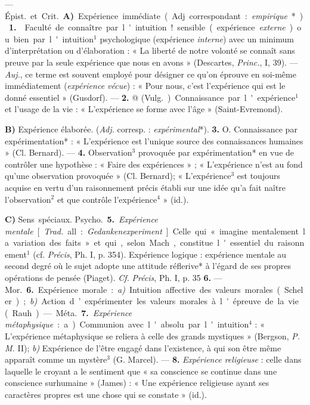 \begin{itemize}[leftmargin=1cm, label=, itemsep=1pt]
 — \si{Épist.} et \si{Crit.} {\bf A)} \si{Expérience immédiate}. (Adj. correspondant : {\it empirique}*). {\bf 1.}  Faculté
de connaître par l'intuition! sensible (expérience {\it externe}) ou bien
par l'intuition$^1$ psychologique (expérience {\it interne}) avec un minimum
d'interprétation ou d'élaboration :
« La liberté de notre volonté se
connaît sans preuve par la seule
expérience que nous en avons »
(Descartes, {\it Princ.}, I, 39). —  {\it Auj.},
ce terme est souvent employé pour
désigner ce qu’on éprouve en soi-même immédiatement ({\it expérience
vécue}) : « Pour nous, c’est l’expérience qui est le donné essentiel »
(Gusdorf). — {\bf 2.} @ (\si{Vulg.}) Connaissance par l'expérience$^1$ et l'usage
de la vie : « L'expérience se forme
avec l’âge » (Saint-Evremond).

{\bf B)}  Expérience élaborée. ({\it Adj.}
corresp. : {\it expérimental}*). {\bf 3.} O. Connaissance par
expérimentation* : « L'expérience est l'unique source
des connaissances humaines » (Cl. Bernard). — {\bf 4.} 
Observation$^3$ provoquée par expérimentation* en vue de contrôler une
hypothèse : « Faire des expériences » ; « L’expérience n’est au fond
qu’une observation provoquée » (Cl. Bernard);
« L'expérience$^3$ est toujours acquise en vertu d'un
raisonnement précis établi sur une idée qu’a fait naître
l'observation$^2$ et que contrôle l’expérience$^4$ » (id.).

{\bf C)} \si{Sens spéciaux}.  \si{Psycho.}
 {\bf 5.} {\it Expérience mentale} [{\it Trad.} all. :
{\it Gedankenexperiment}]. Celle qui
« imagine mentalement la variation
des faits » et qui, selon Mach, constitue l'essentiel du raisonnement$^1$
(cf.  {\it Précis}, Ph. I, p. 354). Expérience logique : expérience mentale
au second degré où le sujet adopte une attitude réflerive* à l'égard de
ses propres opérations de pensée (Piaget). {\it Cf.}  {\it Précis}, Ph. I,
p. 35 {\bf 6.} — \si{Mor.} {\bf 6.} Expérience morale : {\it a)} Intuition
affective des valeurs morales (Scheler); {\it b)} Action d’expérimenter
les valeurs morales à l'épreuve de la vie (Rauh). — \si{Méta.} {\bf 7.}
{\it Expérience métaphysique} : a) Communion
avec l'absolu par l'intuition$^4$ : « L'expérience métaphysique se
reliera à celle des grands mystiques » (Bergson, {\it P. M.} II);
{\it b)} Expérience de l’être engagé dans l'existence, à
qui son être même apparaît comme un mystère$^3$ (G. Marcel).
— {\bf 8.} {\it Expérience religieuse} : celle dans laquelle
le croyant a le sentiment que « sa conscience se continue dans une
conscience surhumaine » (James) : « Une expérience religieuse ayant ses
caractères propres est une chose qui se constate » (id.).


\end{itemize}
